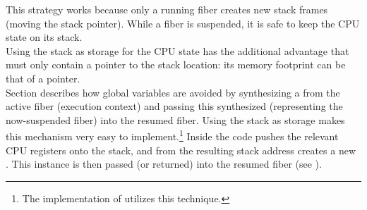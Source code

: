 This strategy works because only a running fiber creates new stack frames
(moving the stack pointer). While a fiber is suspended, it is safe to keep the
CPU state on its stack.\\

Using the stack as storage for the CPU state has the additional advantage that
\fiber must only contain a pointer to the stack location: its memory footprint
can be that of a pointer.\\
Section  describes how global variables are avoided
by synthesizing a \fiber from the active fiber (execution context) and passing
this synthesized \fiber (representing the now-suspended fiber) into the resumed
fiber. Using the stack as storage makes this mechanism very easy to
implement.\footnote{The implementation of \bcontext\cite{bcontext} utilizes this
technique.}
Inside \resume the code pushes the relevant CPU registers onto the stack, and
from the resulting stack address creates a new \fiber. This instance is then
passed (or returned) into the resumed fiber (see ).\\

